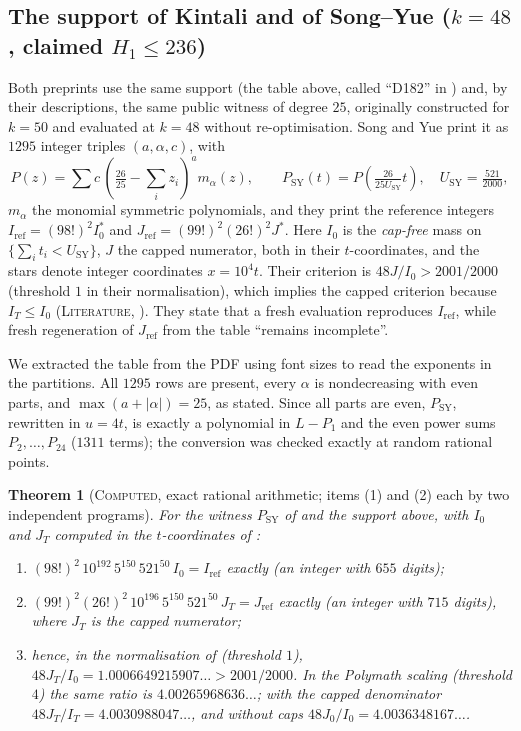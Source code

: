 \documentclass[11pt]{amsart}
\newtheorem{theorem}{Theorem}
\theoremstyle{definition}
\theoremstyle{remark}
\newcommand{\lbl}[1]{\textup{\textsc{#1}}}
\begin{document}
\subsection*{The support of Kintali and of Song--Yue ($k=48$, claimed $H_1\le236$)}
Both preprints use the same support (the table above, called ``D182'' in
\cite{Kin26}) and, by their descriptions, the same public witness of degree
$25$, originally constructed for $k=50$ and evaluated at $k=48$ without
re-optimisation. Song and Yue print it as $1295$ integer triples
$(a,\alpha,c)$, with
\[
P(z)=\sum c\,\left(\tfrac{26}{25}-\textstyle\sum_iz_i\right)^a m_\alpha(z),\qquad
P_{\mathrm{SY}}(t)=P\!\left(\tfrac{26}{25U_{\mathrm{SY}}}t\right),\quad U_{\mathrm{SY}}=\tfrac{521}{2000},
\]
$m_\alpha$ the monomial symmetric polynomials, and they print the reference
integers $I_{\mathrm{ref}}=(98!)^2I_0^\ast$ and
$J_{\mathrm{ref}}=(99!)^2(26!)^2J^\ast$. Here $I_0$ is the \emph{cap-free} mass
on $\{\sum_it_i<U_{\mathrm{SY}}\}$, $J$ the capped numerator, both in their
$t$-coordinates, and the stars denote integer
coordinates $x=10^4t$. Their criterion is $48J/I_0>2001/2000$ (threshold $1$
in their normalisation), which implies
the capped criterion because $I_T\le I_0$ (\lbl{Literature},
\cite[\S4.12, App.~A, App.~C]{SY26}). They state that a fresh evaluation
reproduces $I_{\mathrm{ref}}$, while fresh regeneration of $J_{\mathrm{ref}}$
from the table ``remains incomplete''.

We extracted the table from the PDF using font sizes to read the exponents in
the partitions. All $1295$ rows are present, every $\alpha$ is nondecreasing
with even parts, and $\max(a+|\alpha|)=25$, as stated. Since all parts are
even, $P_{\mathrm{SY}}$, rewritten in $u=4t$, is exactly a polynomial in $L-P_1$ and the even power sums
$P_2,\dots,P_{24}$ ($1311$ terms); the conversion was checked exactly at random
rational points.

\begin{theorem}[\lbl{Computed}, exact rational arithmetic; items (1) and (2) each by two independent programs]\label{thm:sy}
For the witness $P_{\mathrm{SY}}$ of \cite{SY26} and the support above, with
$I_0$ and $J_T$ computed in the $t$-coordinates of \cite{SY26}:
\begin{enumerate}
\item $(98!)^2\,10^{192}\,5^{150}\,521^{50}\,I_0=I_{\mathrm{ref}}$ exactly
(an integer with $655$ digits);
\item $(99!)^2(26!)^2\,10^{196}\,5^{150}\,521^{50}\,J_T=J_{\mathrm{ref}}$
exactly (an integer with $715$ digits), where $J_T$ is the capped numerator;
\item hence, in the normalisation of \cite{SY26} (threshold $1$),
$48J_T/I_0=1.0006649215907\ldots>2001/2000$. In the Polymath scaling
(threshold $4$) the same ratio is $4.00265968636\ldots$; with the capped
denominator $48J_T/I_T=4.0030988047\ldots$, and without caps
$48J_0/I_0=4.0036348167\ldots$.
\end{enumerate}
\end{theorem}
\end{document}
